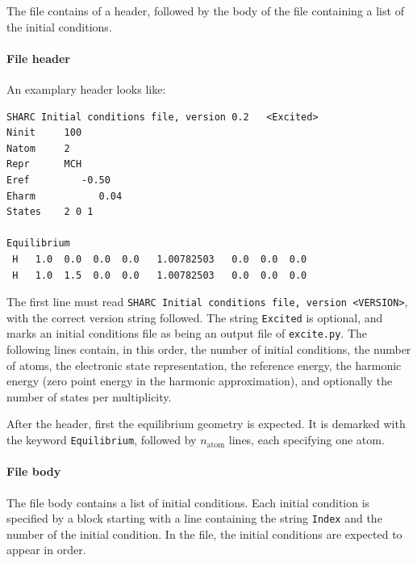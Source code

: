 \documentclass[a4paper,11pt,DIV=15,openany,twoside=false]{scrbook}
\newcommand{\ttt}[1]{\texttt{#1}}
\newenvironment{example}{
  \vspace{0mm}
  \definecolor{shadecolor}{HTML}{BBDDFF}
  \begin{shaded}
  \begin{minipage}{0.9\textwidth}
}{
  \end{minipage}
  \end{shaded}
}
\begin{document}
The file contains of a header, followed by the body of the file containing a list of the initial conditions. 

\paragraph{File header}

An examplary header looks like:
\begin{example}
\footnotesize\begin{verbatim}
SHARC Initial conditions file, version 0.2   <Excited>
Ninit     100
Natom     2
Repr      MCH
Eref         -0.50
Eharm           0.04
States    2 0 1 

Equilibrium
 H   1.0  0.0  0.0  0.0   1.00782503   0.0  0.0  0.0
 H   1.0  1.5  0.0  0.0   1.00782503   0.0  0.0  0.0
\end{verbatim}
\end{example}
The first line must read \ttt{SHARC Initial conditions file, version <VERSION>}, with the correct version string followed. The string \ttt{Excited} is optional, and marks an initial conditions file as being an output file of \ttt{excite.py}. The following lines contain, in this order, the number of initial conditions, the number of atoms, the electronic state representation, the reference energy, the harmonic energy (zero point energy in the harmonic approximation), and optionally the number of states per multiplicity.

After the header, first the equilibrium geometry is expected. It is demarked with the keyword \ttt{Equilibrium}, followed by $n_\text{atom}$ lines, each specifying one atom.

\paragraph{File body}

The file body contains a list of initial conditions. Each initial condition is specified by a block starting with a line containing the string \ttt{Index} and the number of the initial condition. In the file, the initial conditions are expected to appear in order.
\end{document}
